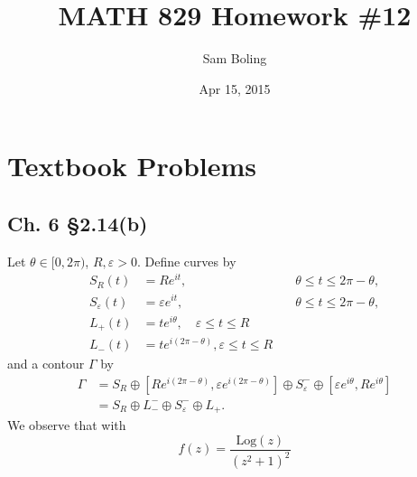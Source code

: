 \documentclass{article}
\title{MATH 829 Homework \#12}
\date{Apr 15, 2015}
\author{Sam Boling}
\newcommand\Log{\mathrm{Log}}
\newcounter{Problem}
\begin{document}
\begin{titlepage}
\maketitle
\end{titlepage}

\section{Textbook Problems}
\subsection{Ch. 6 \S 2.14(b)}
Let $\theta \in [0, 2 \pi)$, $R, \varepsilon > 0$.
Define curves by
\begin{align*}
   S_R(t)
&= R e^{i t},
&  \quad \theta \leq t \leq 2 \pi - \theta, \\
   S_\varepsilon(t)
&= \varepsilon e^{i t},
&  \quad \theta \leq t \leq 2 \pi - \theta, \\
   L_+(t)
&= t e^{i \theta}, \quad \varepsilon \leq t \leq R \\
   L_-(t)
&= t e^{i(2 \pi - \theta)}, \varepsilon \leq t \leq R
\end{align*}
and a contour $\Gamma$ by
\begin{align*}
       \Gamma
&=      S_R
 \oplus [R e^{i(2 \pi - \theta)}, \varepsilon e^{i(2 \pi - \theta)}]
 \oplus S_\varepsilon^{-}
 \oplus [\varepsilon e^{i \theta}, R e^{i \theta}] \\
&=      S_R
 \oplus L_-^{-}
 \oplus S_\varepsilon^{-}
 \oplus L_+.
\end{align*}
We observe that with
$$
  f(z)
= \frac{\Log(z)}{(z^2 + 1)^2}
$$
\end{document}
